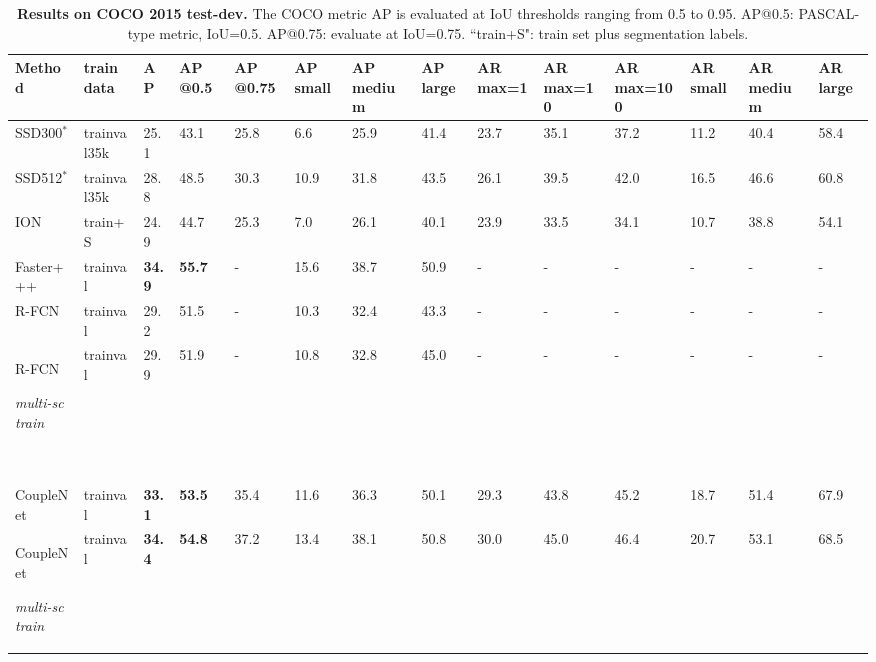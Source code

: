 \documentclass[10pt,twocolumn,letterpaper]{article}
\begin{document}
\begin{table*}[!htbp]
\begin{center}
\begin{tabularx}{\linewidth}{>{\footnotesize}p{2.75cm}|>{\footnotesize}p{1cm}<{\centering}|>{\small}p{0.45cm}<{\centering}|>{\small}p{0.55cm}<{\centering}|>{\small}p{0.7cm}<{\centering}|>{\small}p{0.65cm}<{\centering}
>{\small}p{0.95cm}<{\centering}>{\small}p{0.5cm}<{\centering}|>{\small}p{0.5cm}<{\centering}>{\small}p{0.6cm}<{\centering}>{\small}p{0.9cm}<{\centering}|>{\small}p{0.65cm}<{\centering}>{\small}p{0.95cm}<{\centering}>{\small}p{0.4cm}<{\centering}}
\hline
Method& train data&\footnotesize{AP}&\footnotesize{AP @0.5}&\footnotesize{AP @0.75}&\footnotesize{AP small}&\footnotesize{AP medium}&\footnotesize{AP large}&\footnotesize{AR max=1}&\footnotesize{AR max=10}&\footnotesize{AR max=100}&\footnotesize{AR small}&\footnotesize{AR medium}&\footnotesize{AR large} \\
\hline
SSD300$^*$~\cite{liu2016ssd} & \scriptsize{trainval35k}&25.1&43.1&25.8&6.6&25.9&41.4&23.7&35.1&37.2&11.2&40.4&58.4 \\
SSD512$^*$~\cite{liu2016ssd} & \scriptsize{trainval35k}&28.8&48.5&30.3&10.9&31.8&43.5&26.1&39.5&42.0&16.5&46.6&60.8 \\
\hline
ION~\cite{bell16ion} & \scriptsize{train+S}&24.9&44.7&25.3&7.0&26.1&40.1&23.9&33.5&34.1&10.7&38.8&54.1 \\
Faster+++~\cite{he2016deep} & \scriptsize{trainval}&\textbf{34.9} &\textbf{55.7} &- &15.6 &38.7 &50.9 &- &- &- &-  &- &- \\
R-FCN~\cite{li2016r} & \scriptsize{trainval}  &29.2 &51.5 &- &10.3 &32.4 &43.3 &- &- &- &-  &- &- \\
R-FCN \begin{scriptsize}\textit{multi-sc train}\end{scriptsize}~\cite{li2016r} & \scriptsize{trainval}  &29.9 &51.9 &- &10.8 &32.8 &45.0 &- &- &- &-  &- &- \\
\hline
CoupleNet & \scriptsize{trainval}  &\textbf{33.1} &\textbf{53.5} &35.4 &11.6 &36.3 &50.1 &29.3 &43.8 &45.2 &18.7 &51.4 &67.9 \\
CoupleNet \begin{scriptsize}\textit{multi-sc train}\end{scriptsize} & \scriptsize{trainval}  &\textbf{34.4} &\textbf{54.8} &37.2 &13.4 &38.1 &50.8 &30.0 &45.0 &46.4 &20.7  &53.1 &68.5 \\
\hline
\end{tabularx}
\end{center}
\caption{\textbf{Results on COCO 2015 test-dev.} The COCO metric AP is evaluated at IoU thresholds ranging from 0.5 to 0.95. AP@0.5: PASCAL-type metric, IoU=0.5. AP@0.75: evaluate at IoU=0.75. ``train+S": train set plus segmentation labels.}
\label{COCO}
\end{table*}
\end{document}

